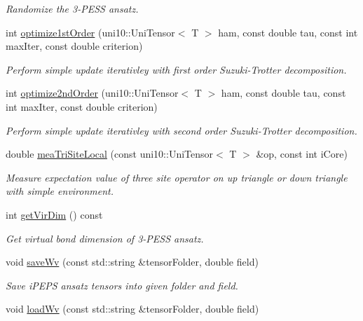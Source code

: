 \begin{DoxyCompactItemize}
\begin{DoxyCompactList}\small\item\em Randomize the 3-\/\+P\+E\+SS ansatz. \end{DoxyCompactList}\item 
int \hyperlink{classpess_aa908b672293063eec17e4edaccbc7f94}{optimize1st\+Order} (uni10\+::\+Uni\+Tensor$<$ T $>$ ham, const double tau, const int max\+Iter, const double criterion)
\begin{DoxyCompactList}\small\item\em Perform simple update iterativley with first order Suzuki-\/\+Trotter decomposition. \end{DoxyCompactList}\item 
int \hyperlink{classpess_a546a17b45825a7b45a44b1d820b2b62d}{optimize2nd\+Order} (uni10\+::\+Uni\+Tensor$<$ T $>$ ham, const double tau, const int max\+Iter, const double criterion)
\begin{DoxyCompactList}\small\item\em Perform simple update iterativley with second order Suzuki-\/\+Trotter decomposition. \end{DoxyCompactList}\item 
double \hyperlink{classpess_aabc2e8ba2916ea568bb5ac148de03d60}{mea\+Tri\+Site\+Local} (const uni10\+::\+Uni\+Tensor$<$ T $>$ \&op, const int i\+Core)
\begin{DoxyCompactList}\small\item\em Measure expectation value of three site operator on up triangle or down triangle with simple environment. \end{DoxyCompactList}\item 
int \hyperlink{classpess_a8c22d7381d7c0a804bb080f0131f221c}{get\+Vir\+Dim} () const 
\begin{DoxyCompactList}\small\item\em Get virtual bond dimension of 3-\/\+P\+E\+SS ansatz. \end{DoxyCompactList}\item 
void \hyperlink{classpess_a2c3eced4bcaa4bb6bb009f5c4c10efe4}{save\+Wv} (const std\+::string \&tensor\+Folder, double field)
\begin{DoxyCompactList}\small\item\em Save i\+P\+E\+PS ansatz tensors into given folder and field. \end{DoxyCompactList}\item 
void \hyperlink{classpess_a2f68a0fb1a32c65ca34fce74d6c98bb1}{load\+Wv} (const std\+::string \&tensor\+Folder, double field)

\end{DoxyCompactItemize}
